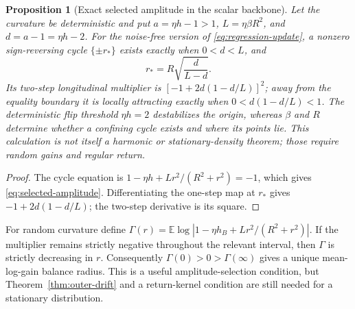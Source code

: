 \documentclass[10pt]{article}
\newtheorem{proposition}[theorem]{Proposition}
\theoremstyle{definition}
\theoremstyle{remark}
\newcommand{\E}{\mathbb E}
\begin{document}
\begin{proposition}[Exact selected amplitude in the scalar backbone]
\label{prop:selected-amplitude}
Let the curvature be deterministic and put
$a=\eta h-1>1$, $L=\eta\beta R^2$, and $d=a-1=\eta h-2$.
For the noise-free version of \eqref{eq:regression-update}, a nonzero
sign-reversing cycle $\{\pm r_*\}$ exists exactly when $0<d<L$, and
\begin{equation}
 r_* = R\sqrt{\frac{d}{L-d}}.
 \label{eq:selected-amplitude}
\end{equation}
Its two-step longitudinal multiplier is
$[-1+2d(1-d/L)]^2$; away from the equality boundary it is locally attracting
exactly when $0<d(1-d/L)<1$.  The deterministic flip threshold
$\eta h=2$ destabilizes the origin, whereas $\beta$ and $R$ determine whether
a confining cycle exists and where its points lie.  This calculation is not
itself a harmonic or stationary-density theorem; those require random gains
and regular return.
\end{proposition}

\begin{proof}
The cycle equation is
$1-\eta h+Lr^2/(R^2+r^2)=-1$, which gives
\eqref{eq:selected-amplitude}.  Differentiating the one-step map at $r_*$
gives $-1+2d(1-d/L)$; the two-step derivative is its square.
\end{proof}

For random curvature define
$\Gamma(r)=\E\log|1-\eta h_B+Lr^2/(R^2+r^2)|$.  If the multiplier remains
strictly negative throughout the relevant interval, then $\Gamma$ is strictly
decreasing in $r$.  Consequently $\Gamma(0)>0>\Gamma(\infty)$ gives a unique
mean-log-gain balance radius.  This is a useful amplitude-selection condition,
but Theorem~\ref{thm:outer-drift} and a return-kernel condition are still
needed for a stationary distribution.
\end{document}
